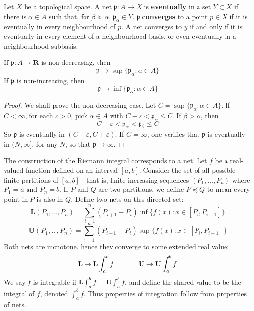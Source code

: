 Let $X$ be a topological space. A net $\mathfrak{p}: A \to X$ is {\bf eventually} in a set $Y \subset X$ if there is $\alpha \in A$ such that, for $\beta \succeq \alpha$, $\mathfrak{p}_\alpha \in Y$. $\mathfrak{p}$ {\bf converges} to a point $p \in X$  if it is eventually in every neighbourhood of $p$. A net converges to $y$ if and only if it is eventually in every element of a neighbourhood basis, or even eventually in a neighbourhood subbasis.

\begin{theorem}
    If $\mathfrak{p}: A \to \mathbf{R}$ is non-decreasing, then
    \[ \mathfrak{p} \to \sup \{ \mathfrak{p}_\alpha : \alpha \in A \} \]
    If $\mathfrak{p}$ is non-increasing, then
    \[ \mathfrak{p} \to \inf \{ \mathfrak{p}_\alpha : \alpha \in A \} \]
\end{theorem}
\begin{proof}
    We shall prove the non-decreasing case. Let $ C = \sup \{ \mathfrak{p}_\alpha : \alpha \in A \}$. If $C < \infty$, for each $\varepsilon > 0$, pick $\alpha \in A$ with $C - \varepsilon < \mathfrak{p}_\alpha \leq C$. If $\beta > \alpha$, then
    \[ C - \varepsilon < \mathfrak{p}_\alpha < \mathfrak{p}_\beta \leq C \]
    So $\mathfrak{p}$ is eventually in $(C - \varepsilon, C + \varepsilon)$. If $C = \infty$, one verifies that $\mathfrak{p}$ is eventually in $(N,\infty]$, for any $N$, so that $\mathfrak{p} \to \infty$.
\end{proof}

\begin{example}
    The construction of the Riemann integral corresponds to a net. Let $f$ be a real-valued function defined on an interval $[a,b]$. Consider the set of all possible finite partitions of $[a,b]$ - that is, finite increasing sequences $(P_1, \dots, P_n)$ where $P_1 = a$ and $P_n = b$. If $P$ and $Q$ are two partitions, we define $P \preceq Q$ to mean every point in $P$ is also in $Q$. Define two nets on this directed set:
    \[ \mathbf{L}(P_1, \dots, P_n) = \sum_{i = 1}^n (P_{i+1} - P_i) \inf \{ f(x) : x \in [P_i, P_{i+1}] \} \]
    \[ \mathbf{U}(P_1, \dots, P_n) = \sum_{i = 1}^n (P_{i+1} - P_i) \sup \{ f(x) : x \in [P_i, P_{i+1}] \} \]
    Both nets are monotone, hence they converge to some extended real value:
    \[ \mathbf{L} \to \mathbf{L} \int_a^b f \hspace{0.5in} \mathbf{U} \to \mathbf{U} \int_a^b f \]
    We say $f$ is integrable if $\mathbf{L} \int_a^b f = \mathbf{U} \int_a^b f$, and define the shared value to be the integral of $f$, denoted $\int_a^b f$. Thus properties of integration follow from properties of nets.
\end{example}

